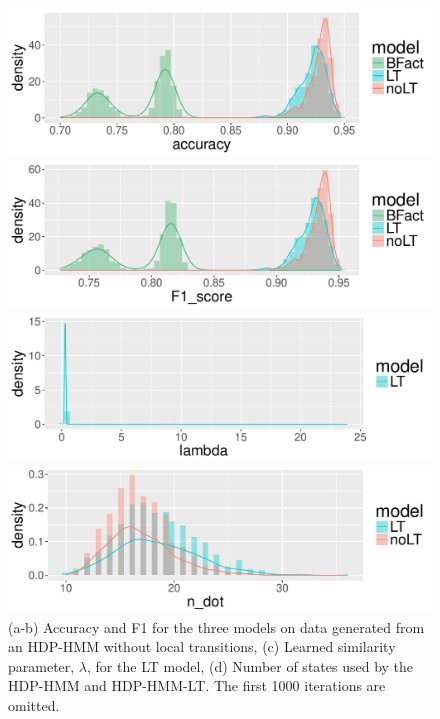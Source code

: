 \begin{figure}[tb]
  \centering
  \begin{minipage}{0.75\textwidth}
  \includegraphics[width = \textwidth]{fig/synth16/accuracy_density.pdf}
\end{minipage}

  \begin{minipage}{0.75\textwidth}
\includegraphics[width = \textwidth]{fig/synth16/F1_score_density.pdf}
\end{minipage}

  \begin{minipage}{0.75\textwidth}
  \includegraphics[width = \textwidth]{fig/synth16/lambda_density.pdf}
\end{minipage}

  \begin{minipage}{0.75\textwidth}
  \includegraphics[width = \textwidth]{fig/synth16/n_dot_density.pdf}
\end{minipage}
  \caption{(a-b) Accuracy and F1 for the three models on data generated 
    from an HDP-HMM without local transitions, (c) Learned similarity
    parameter, $\lambda$,
  for the LT model, (d) Number of states used by
  the HDP-HMM and HDP-HMM-LT.  The first 1000 iterations are omitted.}
  \label{fig:synthetic-results}
\end{figure}

